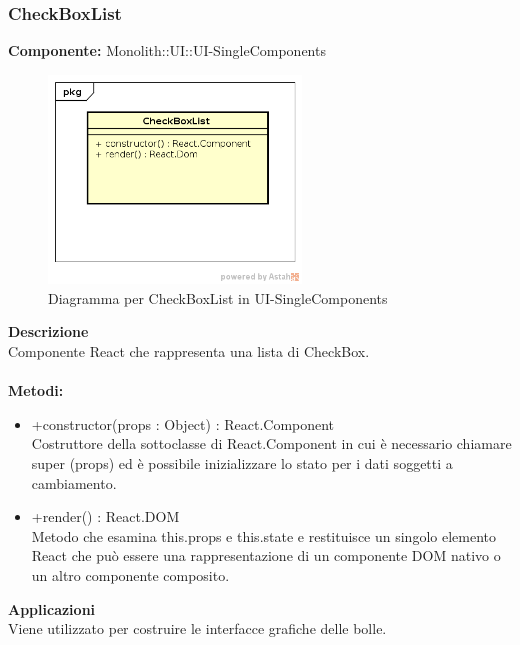 \subsubsection{CheckBoxList}
\textbf{Componente:}  Monolith::UI::UI-SingleComponents\\
   \FloatBarrier
   \begin{figure}[ht]
   \centering
   \includegraphics[width=0.6\textwidth]{img/single-CheckBoxList}
   \caption{{Diagramma per CheckBoxList in UI-SingleComponents}}
\end{figure}
\FloatBarrier
\textbf{Descrizione}\\
Componente React che rappresenta una lista di CheckBox. \\\\
\textbf{Metodi:} \begin{itemize}\item +constructor(props : Object) : React.Component \\Costruttore della sottoclasse di React.Component in cui è necessario chiamare super (props) ed è possibile inizializzare lo stato per i dati soggetti a cambiamento.\item +render() : React.DOM \\Metodo che esamina this.props e this.state e restituisce un singolo elemento React che può essere una rappresentazione di un componente DOM nativo o un altro componente composito.

\end{itemize} 


\textbf{Applicazioni}\\
Viene utilizzato per costruire le interfacce grafiche delle bolle. 


\clearpage

